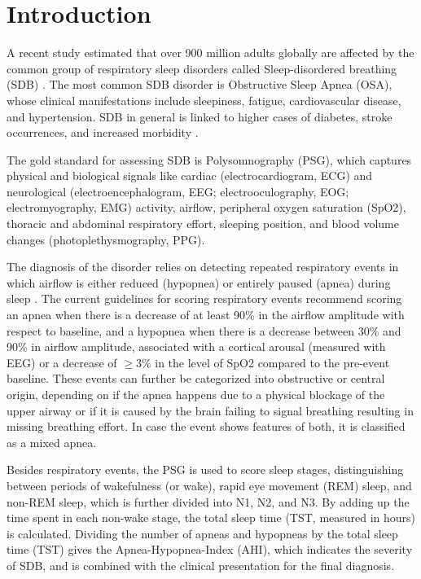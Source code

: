 \chapter{Introduction \label{Chapter-Intro}}

A recent study estimated that over 900 million adults globally are affected by the common group of respiratory sleep disorders called Sleep-disordered breathing (SDB) \cite{benjafield2019estimation}. The most common SDB disorder is Obstructive Sleep Apnea (OSA), whose clinical manifestations include sleepiness, fatigue, cardiovascular disease, and hypertension. SDB in general is linked to higher cases of diabetes, stroke occurrences, and increased morbidity \cite{dempsey2010dempsey,patil2007adult,young2002epidemiology}.

The gold standard for assessing SDB is Polysomnography (PSG), which captures physical and biological signals like cardiac (electrocardiogram, ECG) and neurological (electroencephalogram, EEG; electrooculography, EOG; electromyography, EMG) activity, airflow, peripheral oxygen saturation (SpO2), thoracic and abdominal respiratory effort, sleeping position, and blood volume changes (photoplethysmography, PPG).

The diagnosis of the disorder relies on detecting repeated respiratory events in which airflow is either reduced (hypopnea) or entirely paused (apnea) during sleep \cite{dempsey2010dempsey,gould2012sleep}.
The current guidelines for scoring respiratory events \cite{troester2023aasm} recommend scoring an apnea when there is a decrease of at least 90\% in the airflow amplitude with respect to baseline, and a hypopnea when there is a decrease between 30\% and 90\% in airflow amplitude, associated with a cortical arousal (measured with EEG) or a decrease of $\geq 3\%$ in the level of SpO2 compared to the pre-event baseline.
These events can further be categorized into obstructive or central origin, depending on if the apnea happens due to a physical blockage of the upper airway or if it is caused by the brain failing to signal breathing resulting in missing breathing effort. In case the event shows features of both, it is classified as a mixed apnea.

Besides respiratory events, the PSG is used to score sleep stages, distinguishing between periods of wakefulness (or wake), rapid eye movement (REM) sleep, and non-REM sleep, which is further divided into N1, N2, and N3. By adding up the time spent in each non-wake stage, the total sleep time (TST, measured in hours) is calculated. Dividing the number of apneas and hypopneas by the total sleep time (TST) gives the Apnea-Hypopnea-Index (AHI), which indicates the severity of SDB, and is combined with the clinical presentation for the final diagnosis.

